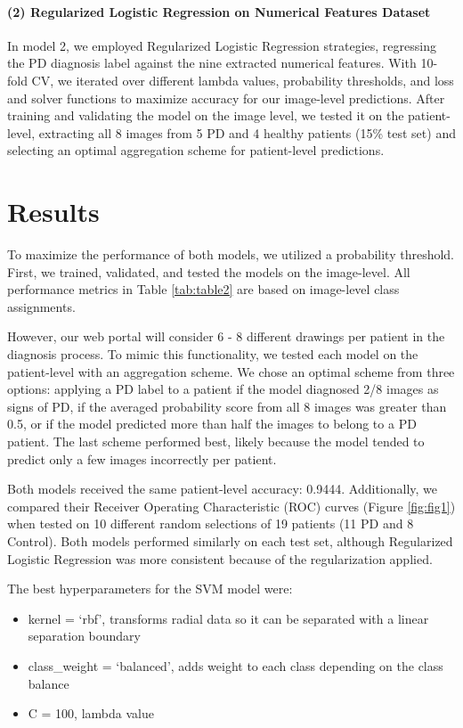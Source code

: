 \documentclass[pmlr,twocolumn,10pt]{jmlr} %
\begin{document}
\label{sec:LogReg}  
\paragraph{(2) Regularized Logistic Regression on Numerical Features Dataset} In model 2, we employed Regularized Logistic Regression \citep{tibshirani1996regression} strategies, regressing the PD diagnosis label against the nine extracted numerical features. With 10-fold CV, we iterated over different lambda values, probability thresholds, and loss and solver functions to maximize accuracy for our image-level predictions. After training and validating the model on the image level, we tested it on the patient-level, extracting all 8 images from 5 PD and 4 healthy patients (15\% test set) and selecting an optimal aggregation scheme for patient-level predictions.  

\section{Results}
\label{Results} To maximize the performance of both models, we utilized a probability threshold. First, we trained, validated, and tested the models on the image-level. All performance metrics in Table \ref{tab:table2} are based on image-level class assignments.

However, our web portal will consider 6 - 8 different drawings per patient in the diagnosis process. To mimic this functionality, we tested each model on the patient-level with an aggregation scheme. We chose an optimal scheme from three options: applying a PD label to a patient if the model diagnosed 2/8 images as signs of PD, if the averaged probability score from all 8 images was greater than 0.5, or if the model predicted more than half the images to belong to a PD patient. The last scheme performed best, likely because the model tended to predict only a few images incorrectly per patient.

Both models received the same patient-level accuracy: 0.9444. Additionally, we compared their Receiver Operating Characteristic (ROC) curves (Figure \ref{fig:fig1}) when tested on 10 different random selections of 19 patients (11 PD and 8 Control). Both models performed similarly on each test set, although Regularized Logistic Regression was more consistent because of the regularization applied.

The best hyperparameters for the SVM model were:
\begin{itemize}
\item kernel = ‘rbf’, transforms radial data so it can be separated with a linear separation boundary
\item class\_weight = ‘balanced’, adds weight to each class depending on the class balance
\item C = 100, lambda value
\end{itemize}
\end{document}
